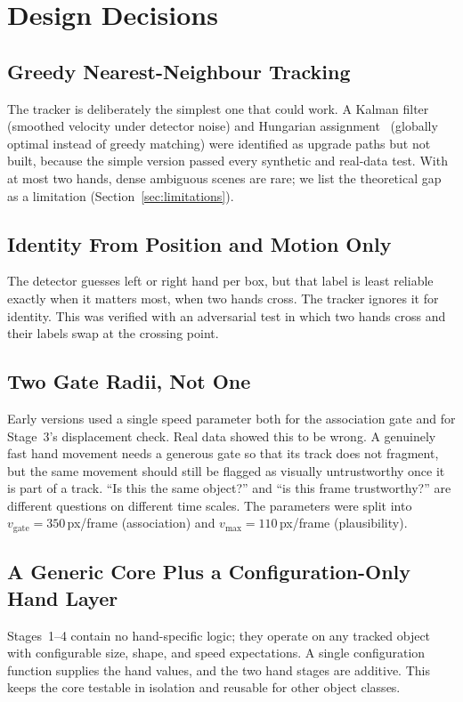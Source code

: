 \documentclass[journal]{IEEEtran}
\begin{document}
\section{Design Decisions}
\label{sec:design}

\subsection{Greedy Nearest-Neighbour Tracking}
The tracker is deliberately the simplest one that could work. A Kalman filter~\cite{kalman1960} (smoothed velocity under detector noise) and Hungarian assignment~\cite{kuhn1955hungarian} (globally optimal instead of greedy matching) were identified as upgrade paths but not built, because the simple version passed every synthetic and real-data test. With at most two hands, dense ambiguous scenes are rare; we list the theoretical gap as a limitation (Section~\ref{sec:limitations}).

\subsection{Identity From Position and Motion Only}
The detector guesses left or right hand per box, but that label is least reliable exactly when it matters most, when two hands cross. The tracker ignores it for identity. This was verified with an adversarial test in which two hands cross and their labels swap at the crossing point.

\subsection{Two Gate Radii, Not One}
\label{sec:gates}
Early versions used a single speed parameter both for the association gate and for Stage~3's displacement check. Real data showed this to be wrong. A genuinely fast hand movement needs a generous gate so that its track does not fragment, but the same movement should still be flagged as visually untrustworthy once it is part of a track. ``Is this the same object?'' and ``is this frame trustworthy?'' are different questions on different time scales. The parameters were split into $v_{\mathrm{gate}}=350$\,px/frame (association) and $v_{\max}=110$\,px/frame (plausibility).

\subsection{A Generic Core Plus a Configuration-Only Hand Layer}
Stages~1--4 contain no hand-specific logic; they operate on any tracked object with configurable size, shape, and speed expectations. A single configuration function supplies the hand values, and the two hand stages are additive. This keeps the core testable in isolation and reusable for other object classes.
\end{document}
